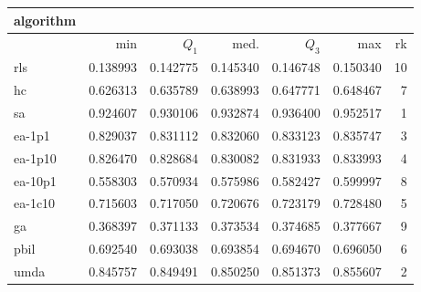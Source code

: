 \begin{tabular}{@{}l*{5}{>{{}}N{1}{3}}>{{}}N{2}{0}@{}}
\toprule
{algorithm} &  \\
\midrule
& {min} & {$Q_1$} & {med.} & {$Q_3$} & {max} & {rk}\\
\midrule
rls & 0.138993 & 0.142775 & 0.145340 & 0.146748 & 0.150340 & 10\\
hc & 0.626313 & 0.635789 & 0.638993 & 0.647771 & 0.648467 & 7\\
sa & {\color{blue}} 0.924607 & {\color{blue}} 0.930106 & {\color{blue}} 0.932874 & {\color{blue}} 0.936400 & {\color{blue}} 0.952517 & 1\\
ea-1p1 & 0.829037 & 0.831112 & 0.832060 & 0.833123 & 0.835747 & 3\\
ea-1p10 & 0.826470 & 0.828684 & 0.830082 & 0.831933 & 0.833993 & 4\\
ea-10p1 & 0.558303 & 0.570934 & 0.575986 & 0.582427 & 0.599997 & 8\\
ea-1c10 & 0.715603 & 0.717050 & 0.720676 & 0.723179 & 0.728480 & 5\\
ga & 0.368397 & 0.371133 & 0.373534 & 0.374685 & 0.377667 & 9\\
pbil & 0.692540 & 0.693038 & 0.693854 & 0.694670 & 0.696050 & 6\\
umda & 0.845757 & 0.849491 & 0.850250 & 0.851373 & 0.855607 & 2\\
\bottomrule
\end{tabular}

